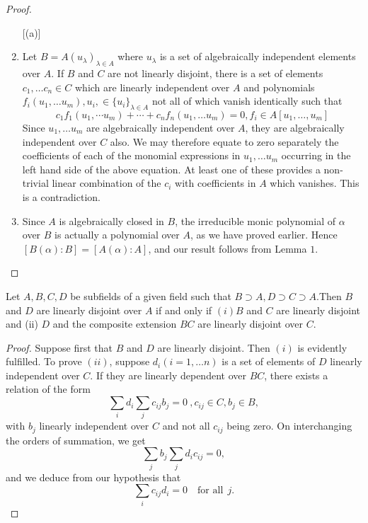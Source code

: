 \begin{proof}
  \begin{enumerate} [(a)]
  \item Let $B = A(u_\lambda)_{ \lambda \in A}$ where
    $u_\lambda$ is a set of algebraically independent elements over
    $A$. If $B$ and $C$ are not linearly disjoint, there is a set of
    elements $c_1, \ldots c_n \in C$ which are linearly independent
    over $A$ and polynomials $f_i (u_1 , \ldots u_m ), u_i, \in
    \{u_i\}_{\lambda \in A}$ not all of which vanish identically
    such that 
    $$
    c_1 f_1 (u_1 , \cdots u_m ) + \cdots + c_n f_n (u_1 , \ldots u_m)
    = 0, f_i \in A[u_1 , \ldots , u_m] 
    $$
    Since $u_1 , \ldots u_m$ are algebraically independent over $A$,
    they are algebraically independent over $C$ also. We may therefore
    equate to zero separately the coefficients of each of the monomial
    expressions in $u_1 , \ldots u_m$ occurring in the left hand side
    of the above equation. At least one of these provides a
    non-trivial linear combination of the $c_i$ with coefficients in
    $A$ which vanishes. This is a contradiction. 
  \item Since $A$ is algebraically closed in $B$, the irreducible
    monic polynomial of $\alpha$ over $B$ is actually a polynomial
    over $A$, as we have proved earlier. Hence $[ B(\alpha) : B ] = [A
      (\alpha) : A]$, and our result follows from Lemma $1$. 
  \end{enumerate}
\end{proof}

\begin{Lemma}\label{chap22:sec37:lem3}%
  Let $A, B, C, D$ be subfields of a given field such that $B \supset
  A, D \supset C \supset A$.\pageoriginale Then $B$ and $D$ are linearly disjoint
  over $A$ if and only if $(i) B$ and $C$ are linearly disjoint and
  (ii) $D$ and the composite extension $BC$ are linearly disjoint over
  $C$. 
\end{Lemma}

\begin{proof}
  Suppose first that $B$ and $D$ are linearly disjoint. Then $(i)$ is
  evidently fulfilled. To prove $(ii)$, suppose $d_i (i = 1, \ldots
  n)$ is a set of elements of $D$ linearly independent over $C$. If
  they are linearly dependent over $BC$, there exists a relation of
  the form 
  $$
  \sum_i d_i \sum_j c_{ij} b_j = 0 ~ , c_{ij} \in C, b_j \in B,
  $$
  with $b_j$ linearly independent over $C$ and not all $c_{ij} $ being
  zero. On interchanging the orders of summation, we get 
  $$
  \sum_j b_j \sum_j d_i c_{ij} = 0,
  $$
  and we deduce from our hypothesis that
  $$
  \sum_i c_{ij } d_i = 0 \quad \text{for all} ~~j.
  $$
\end{proof}

